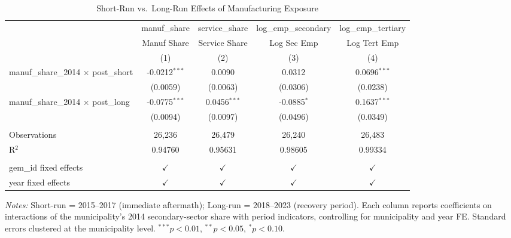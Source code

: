 
\begin{table}[htbp]
   \caption{\label{tab:short_long} Short-Run vs.\ Long-Run Effects of Manufacturing Exposure}
   \bigskip
   \centering
   \begin{adjustbox}{max width=\textwidth}
   \begin{tabular}{lcccc}
      \toprule
                                                  & manuf\_share    & service\_share  & log\_emp\_secondary   & log\_emp\_tertiary\\    
                                                  & Manuf Share     & Service Share   & Log Sec Emp           & Log Tert Emp \\   
                                                  & (1)             & (2)             & (3)                   & (4)\\  
      \midrule 
      manuf\_share\_2014 $\times$ post\_short     & -0.0212$^{***}$ & 0.0090          & 0.0312                & 0.0696$^{***}$\\   
                                                  & (0.0059)        & (0.0063)        & (0.0306)              & (0.0238)\\   
      manuf\_share\_2014 $\times$ post\_long      & -0.0775$^{***}$ & 0.0456$^{***}$  & -0.0885$^{*}$         & 0.1637$^{***}$\\   
                                                  & (0.0094)        & (0.0097)        & (0.0496)              & (0.0349)\\   
       \\
      Observations                                & 26,236          & 26,479          & 26,240                & 26,483\\  
      R$^2$                                       & 0.94760         & 0.95631         & 0.98605               & 0.99334\\  
       \\
      gem\_id fixed effects                       & $\checkmark$    & $\checkmark$    & $\checkmark$          & $\checkmark$\\   
      year fixed effects                          & $\checkmark$    & $\checkmark$    & $\checkmark$          & $\checkmark$\\   
      \bottomrule
   \end{tabular}
   \end{adjustbox}

   \par \raggedright \footnotesize
   \textit{Notes:} Short-run = 2015--2017 (immediate aftermath); Long-run = 2018--2023 (recovery period). Each column reports coefficients on interactions of the municipality's 2014 secondary-sector share with period indicators, controlling for municipality and year FE. Standard errors clustered at the municipality level. $^{***}p<0.01$, $^{**}p<0.05$, $^{*}p<0.10$.
\end{table}


